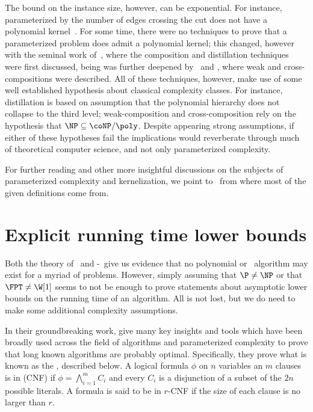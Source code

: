 The bound on the instance size, however, can be exponential.
For instance,  parameterized by the number of edges crossing the cut does not have a polynomial kernel~\citep{matching_cut_ipec}.
For some time, there were no techniques to prove that a parameterized problem does  admit a polynomial kernel; this changed, however with the seminal work of~\cite{BodlaenderDFH09}, where the composition and distillation techniques were first discussed, being was further deepened
by~\cite{weak_composition} and \cite{BodlaenderJK14}, where weak and cross-compositions were described.
All of these techniques, however, make use of some well established hypothesis about classical complexity classes.
For instance, distillation is based on assumption that the polynomial hierarchy does not collapse to the third level; weak-composition and cross-composition rely on the hypothesis that $\NP \subseteq \coNP/\poly$.
Despite appearing strong assumptions, if either of these hypotheses fail the implications would reverberate through much of theoretical computer science, and not only parameterized complexity.

For further reading and other more insightful discussions on the subjects of parameterized complexity and kernelization, we point to~\citep{downey_fellows, cygan_parameterized, book-kernels} from where most of the given definitions come from. 

\section{Explicit running time lower bounds}

Both the theory of \NPcness\ and \W[1]-\Hness\ give us evidence that no polynomial or \FPT\ algorithm may exist for a myriad of problems.
However, simply assuming that $\P \neq \NP$ or that $\FPT \neq \W[1]$ seems to not be enough to prove statements about asymptotic lower bounds on the running time of an algorithm.
All is not lost, but we do need to make some additional complexity assumptions.

In their groundbreaking work, \cite{eth} give many key insights and tools which have been broadly used across the field of algorithms and parameterized complexity to prove that long known algorithms are probably optimal.
Specifically, they prove what is known as the , described below.
A logical formula $\phi$ on $n$ variables an $m$ clauses is in  (CNF) if $\phi = \bigwedge_{i=1}^m C_i$ and every $C_i$ is a disjunction of a subset of the $2n$ possible literals.
A formula is said to be in $r$-CNF if the size of each clause is no larger than $r$.

